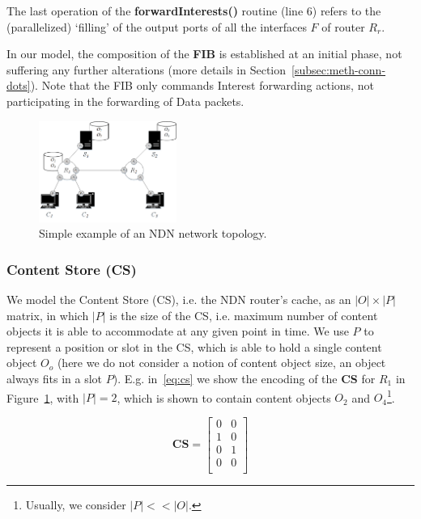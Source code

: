The last operation of the \textbf{forwardInterests()} routine (line 6) refers to 
the (parallelized) `filling' of the output ports of all the interfaces $F$ of router $R_r$.\shortvertbreak

In our model, the composition of the \textbf{FIB} is established at an initial phase, 
not suffering any further alterations (more details in 
Section~\ref{subsec:meth-conn-dots}). Note 
that the FIB only commands Interest forwarding actions, not participating in the 
forwarding of Data packets.\shortvertbreak

\begin{figure}[h!]

    \centering
    \includegraphics[width=0.40\textwidth]{figures/fib-topo.png}
    \cprotect\caption{Simple example of an NDN network topology.}
    \label{fig:fib-topo}

\end{figure}

\subsubsection{Content Store (CS)}
\label{subsec:meth-cs}

We model the Content Store (CS), i.e. the NDN router's cache, as an $|O| 
\times |P|$ matrix, in which $|P|$ is the size of the CS, i.e. maximum 
number of content objects it is able to accommodate at any given point in time. 
We use $P$ to represent a position or slot in the CS, which is able to hold a single 
content object $O_o$ (here we do not consider a notion of content object size, 
an object always fits in a slot $P$). E.g. in~\ref{eq:cs} we show the encoding 
of the \textbf{CS} for $R_1$ in Figure~\ref{fig:fib-topo}, with $|P| = 2$, 
which is shown to contain content objects $O_2$ and $O_4$\footnote{Usually, 
we consider $|P| << |O|$.}.

\begin{equation}
\textbf{CS} = \begin{bmatrix} 0 & 0             \\ 
                1 & 0                           \\ 
                0 & 1                           \\ 
                0 & 0                           \\ \end{bmatrix}
    \label{eq:cs}
\end{equation}\shortvertbreak

